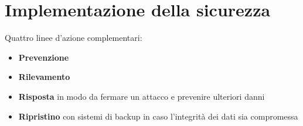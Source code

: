 \section{Implementazione della sicurezza}
Quattro linee d'azione complementari:
\begin{itemize}
    \item \textbf{Prevenzione}
    \item \textbf{Rilevamento}
    \item \textbf{Risposta} in modo da fermare un attacco e prevenire ulteriori danni
    \item \textbf{Ripristino} con sistemi di backup in caso l'integrità dei dati sia compromessa
\end{itemize}























